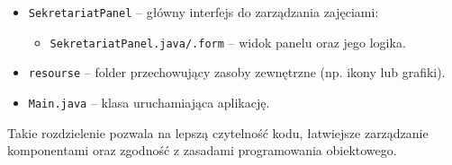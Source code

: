 \begin{itemize}
    \item \texttt{SekretariatPanel} – główny interfejs do zarządzania zajęciami:
    \begin{itemize}
        \item \texttt{SekretariatPanel.java/.form} – widok panelu oraz jego logika.
    \end{itemize}

    \item \texttt{resourse} – folder przechowujący zasoby zewnętrzne (np. ikony lub grafiki).

    \item \texttt{Main.java} – klasa uruchamiająca aplikację.
\end{itemize}

Takie rozdzielenie pozwala na lepszą czytelność kodu, łatwiejsze zarządzanie komponentami oraz zgodność z zasadami programowania obiektowego.
